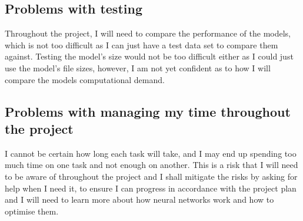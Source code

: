 \documentclass{article}
\begin{document}
\subsection{Problems with testing}
Throughout the project, I will need to compare the performance of the models, which is not too difficult as I can just have a test data set to compare them against. Testing the model's size would not be too difficult either as I could just use the model's file sizes, however, I am not yet confident as to how I will compare the models computational demand.

\subsection{Problems with managing my time throughout the project}
I cannot be certain how long each task will take, and I may end up spending too much time on one task and not enough on another.
This is a risk that I will need to be aware of throughout the project and I shall mitigate the risks by asking for help when I need it, to ensure I can progress in accordance with the project plan and I will need to learn more about how neural networks work 
and how to optimise them.

\pagebreak

\printbibliography
\end{document}
